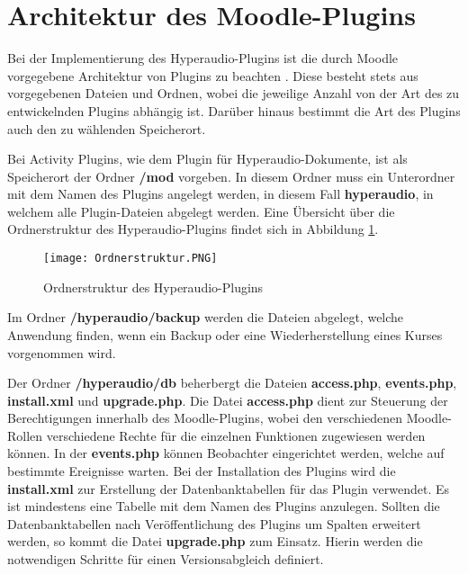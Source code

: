 
\section{Architektur des Moodle-Plugins}
\label{sec:architektur}
Bei der Implementierung des Hyperaudio-Plugins ist die durch Moodle vorgegebene Architektur von Plugins zu beachten \citep{moodle2016activity}. Diese besteht stets aus vorgegebenen Dateien und Ordnen, wobei die jeweilige Anzahl von der Art des zu entwickelnden Plugins abhängig ist. Darüber hinaus bestimmt die Art des Plugins auch den zu wählenden Speicherort.

Bei Activity Plugins, wie dem Plugin für Hyperaudio-Dokumente, ist als Speicherort der Ordner \textbf{/mod} vorgeben. In diesem Ordner muss ein Unterordner mit dem Namen des Plugins angelegt werden, in diesem Fall \textbf{hyperaudio}, in welchem alle Plugin-Dateien abgelegt werden. Eine Übersicht über die Ordnerstruktur des Hyperaudio-Plugins findet sich in Abbildung \ref{fig:Ordnerstruktur}.

\begin{figure}[h!]
\texttt{[image: Ordnerstruktur.PNG]}
\caption{\label{fig:Ordnerstruktur}Ordnerstruktur des Hyperaudio-Plugins}
\end{figure}


Im Ordner \textbf{/hyperaudio/backup} werden die Dateien abgelegt, welche Anwendung finden, wenn ein Backup oder eine Wiederherstellung eines Kurses vorgenommen wird.

Der Ordner \textbf{/hyperaudio/db} beherbergt die Dateien \textbf{access.php}, \textbf{events.php}, \textbf{install.xml} und \textbf{upgrade.php}. Die Datei \textbf{access.php} dient zur Steuerung der Berechtigungen innerhalb des Moodle-Plugins, wobei den verschiedenen Moodle-Rollen verschiedene Rechte für die einzelnen Funktionen zugewiesen werden können. In der \textbf{events.php} können Beobachter eingerichtet werden, welche auf bestimmte Ereignisse warten. Bei der Installation des Plugins wird die \textbf{install.xml} zur Erstellung der Datenbanktabellen für das Plugin verwendet. Es ist mindestens eine Tabelle mit dem Namen des Plugins anzulegen. Sollten die Datenbanktabellen nach Veröffentlichung des Plugins um Spalten erweitert werden, so kommt die Datei \textbf{upgrade.php} zum Einsatz. Hierin werden die notwendigen Schritte für einen Versionsabgleich definiert.

